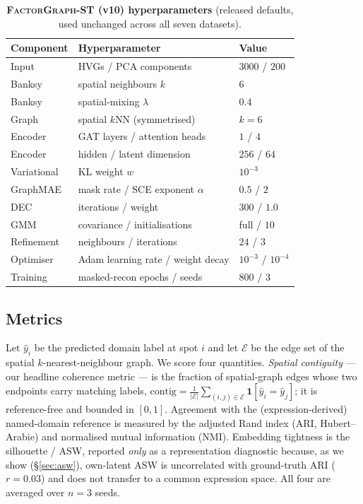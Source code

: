 \documentclass[10pt,letterpaper]{article}
\begin{document}
\begin{table}[t]
  \centering
  \small
  \caption{\textbf{\textsc{FactorGraph-ST} (v10) hyperparameters} (released defaults, used
  unchanged across all seven datasets).}
  \label{tab:hparams}
  \begin{tabular}{@{}lll@{}}
    \toprule
    Component & Hyperparameter & Value \\
    \midrule
    Input        & HVGs / PCA components            & $3000$ / $200$ \\
    Banksy       & spatial neighbours $k$           & $6$ \\
    Banksy       & spatial-mixing $\lambda$         & $0.4$ \\
    Graph        & spatial $k$NN (symmetrised)      & $k=6$ \\
    Encoder      & GAT layers / attention heads     & $1$ / $4$ \\
    Encoder      & hidden / latent dimension        & $256$ / $64$ \\
    Variational  & KL weight $w$                    & $10^{-3}$ \\
    GraphMAE     & mask rate / SCE exponent $\alpha$& $0.5$ / $2$ \\
    DEC          & iterations / weight              & $300$ / $1.0$ \\
    GMM          & covariance / initialisations     & full / $10$ \\
    Refinement   & neighbours / iterations          & $24$ / $3$ \\
    Optimiser    & Adam learning rate / weight decay& $10^{-3}$ / $10^{-4}$ \\
    Training     & masked-recon epochs / seeds      & $800$ / $3$ \\
    \bottomrule
  \end{tabular}
\end{table}

\subsection{Metrics}
\label{sec:metrics}

Let $\hat{y}_i$ be the predicted domain label at spot $i$ and let $\mathcal{E}$ be the edge
set of the spatial $k$-nearest-neighbour graph. We score four quantities. \emph{Spatial
contiguity} --- our headline coherence metric --- is the fraction of spatial-graph edges
whose two endpoints carry matching labels,
$\mathrm{contig}=\frac{1}{|\mathcal{E}|}\sum_{(i,j)\in\mathcal{E}}\mathbf{1}[\hat{y}_i=\hat{y}_j]$;
it is reference-free and bounded in $[0,1]$. Agreement with the (expression-derived)
named-domain reference is measured by the adjusted Rand index (ARI, Hubert--Arabie) and
normalised mutual information (NMI). Embedding tightness is the silhouette / ASW, reported
\emph{only} as a representation diagnostic because, as we show (\S\ref{sec:asw}), own-latent
ASW is uncorrelated with ground-truth ARI ($r{=}0.03$) and does not transfer to a common
expression space. All four are averaged over $n=3$ seeds.
\end{document}
